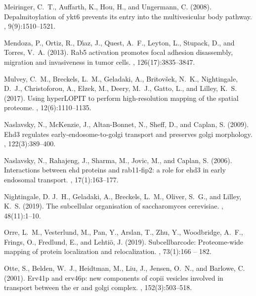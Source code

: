 \documentclass[12pt,english]{article}
\begin{document}
\begin{thebibliography}{}
Meiringer, C.~T., Auffarth, K., Hou, H., and Ungermann, C. (2008).
\newblock Depalmitoylation of ykt6 prevents its entry into the multivesicular
  body pathway.
, 9(9):1510--1521.

Mendoza, P., Ortiz, R., D{\'\i}az, J., Quest, A.~F., Leyton, L., Stupack, D.,
  and Torres, V.~A. (2013).
\newblock Rab5 activation promotes focal adhesion disassembly, migration and
  invasiveness in tumor cells.
, 126(17):3835--3847.

Mulvey, C.~M., Breckels, L.~M., Geladaki, A., Britov{\v{s}}ek, N.~K.,
  Nightingale, D.~J., Christoforou, A., Elzek, M., Deery, M.~J., Gatto, L., and
  Lilley, K.~S. (2017).
\newblock Using {hyperLOPIT} to perform high-resolution mapping of the spatial
  proteome.
, 12(6):1110--1135.

Naslavsky, N., McKenzie, J., Altan-Bonnet, N., Sheff, D., and Caplan, S.
  (2009).
\newblock Ehd3 regulates early-endosome-to-golgi transport and preserves golgi
  morphology.
, 122(3):389--400.

Naslavsky, N., Rahajeng, J., Sharma, M., Jovic, M., and Caplan, S. (2006).
\newblock Interactions between ehd proteins and rab11-fip2: a role for ehd3 in
  early endosomal transport.
, 17(1):163--177.

Nightingale, D. J.~H., Geladaki, A., Breckels, L.~M., Oliver, S.~G., and
  Lilley, K.~S. (2019).
\newblock The subcellular organisation of saccharomyces cerevisiae.
, 48(11):1--10.

Orre, L.~M., Vesterlund, M., Pan, Y., Arslan, T., Zhu, Y., Woodbridge, A.~F.,
  Frings, O., Fredlund, E., and Lehtiö, J. (2019).
\newblock Subcellbarcode: Proteome-wide mapping of protein localization and
  relocalization.
, 73(1):166 -- 182.

Otte, S., Belden, W.~J., Heidtman, M., Liu, J., Jensen, O.~N., and Barlowe, C.
  (2001).
\newblock Erv41p and erv46p: new components of copii vesicles involved in
  transport between the er and golgi complex.
, 152(3):503--518.


\end{thebibliography}
\end{document}
